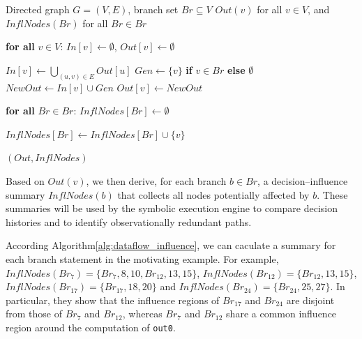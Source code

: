\documentclass[conference]{IEEEtran}
\begin{document}
\begin{algorithm}[H]
    \small
    \caption{ComputeBranchInfluence}
    \label{alg:dataflow_influence}
    \begin{algorithmic}[1]
    \Require Directed graph $G = (V, E)$, branch set $Br \subseteq V$
    \Ensure $Out(v)$ for all $v \in V$, and $InflNodes(Br)$ for all $Br \in Br$
    
    \State \textbf{for all} $v \in V$: $In[v] \gets \emptyset$, $Out[v] \gets \emptyset$
    
    \Repeat
            \State $In[v] \gets \bigcup_{(u,v)\in E} Out[u]$
            \State $Gen \gets \{v\}$ \textbf{if} $v \in Br$ \textbf{else} $\emptyset$
            \State $NewOut \gets In[v] \cup Gen$
                \State $Out[v] \gets NewOut$
            \EndIf
        \EndFor
    
    \State \textbf{for all} $Br \in Br$: $InflNodes[Br] \gets \emptyset$
    
            \State $InflNodes[Br] \gets InflNodes[Br] \cup \{v\}$
        \EndFor
    \EndFor
    
    \State \Return $(Out, InflNodes)$
    \end{algorithmic}
\end{algorithm}
\vspace{-3mm}
Based on $Out(v)$, we then derive, for each branch $b \in Br$, a
decision--influence summary $InflNodes(b)$ that collects all nodes potentially affected by $b$. These summaries will be used by the symbolic execution engine to compare decision histories and to identify observationally redundant paths.

According Algorithm\ref{alg:dataflow_influence}, we can caculate a summary for each branch statement in the motivating example. For example, $InflNodes(Br_7) = \{Br_7, 8, 10, Br_{12}, 13, 15\}$, $InflNodes(Br_12) = \{ Br_{12}, 13, 15\}$, $InflNodes(Br_{17}) = \{ Br_{17}, 18, 20\}$ and $InflNodes(Br_{24}) = \{ Br_{24}, 25, 27\}$.  In particular, they show that the influence regions of $Br_{17}$ and $Br_{24}$ are disjoint from those of $Br_{7}$ and $Br_{12}$, whereas $Br_{7}$ and $Br_{12}$ share a common influence region around the computation of \texttt{out0}.
\vspace{-3mm}
\end{document}
